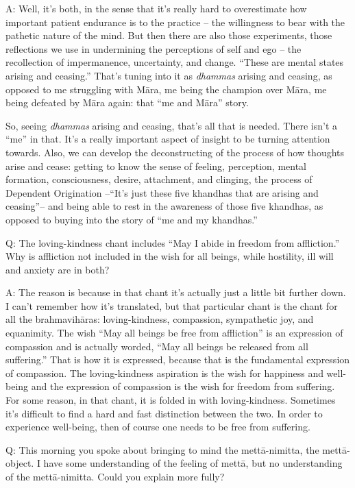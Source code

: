 \qaspace
A: Well, it’s both, in the sense that it’s really hard to overestimate
how important patient endurance is to the practice – the willingness to
bear with the pathetic nature of the mind. But then there are also those
experiments, those reflections we use in undermining the perceptions of
self and ego – the recollection of impermanence, uncertainty, and
change. “These are mental states arising and ceasing.” That’s tuning
into it as \emph{dhammas} arising and ceasing, as opposed to me
struggling with Māra, me being the champion over Māra, me being defeated
by Māra again: that “me and Māra” story.

So, seeing \emph{dhammas} arising and ceasing, that’s all that is
needed. There isn’t a “me” in that. It’s a really important aspect of
insight to be turning attention towards. Also, we can develop the
deconstructing of the process of how thoughts arise and cease: getting
to know the sense of feeling, perception, mental formation,
consciousness, desire, attachment, and clinging, the process of
Dependent Origination –“It’s just these five khandhas that are arising
and ceasing”– and being able to rest in the awareness of those five
khandhas, as opposed to buying into the story of “me and my khandhas.”

\qaspace
Q: The loving-kindness chant includes “May I abide in freedom from
affliction.” Why is affliction not included in the wish for all beings,
while hostility, ill will and anxiety are in both?

\qaspace
A: The reason is because in that chant it’s actually just a little bit
further down. I can’t remember how it’s translated, but that particular
chant is the chant for all the brahmavihāras: loving-kindness,
compassion, sympathetic joy, and equanimity. The wish “May all beings be
free from affliction” is an expression of compassion and is actually
worded, “May all beings be released from all suffering.” That is how it
is expressed, because that is the fundamental expression of compassion.
The loving-kindness aspiration is the wish for happiness and well-being
and the expression of compassion is the wish for freedom from suffering.
For some reason, in that chant, it is folded in with loving-kindness.
Sometimes it’s difficult to find a hard and fast distinction between the
two. In order to experience well-being, then of course one needs to be
free from suffering.

\qaspace
Q: This morning you spoke about bringing to mind the mettā-nimitta, the
mettā-object. I have some understanding of the feeling of mettā, but no
understanding of the mettā-nimitta. Could you explain more fully?

